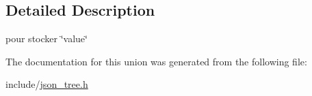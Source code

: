 \subsection{Detailed Description}
pour stocker \char`\"{}value\char`\"{} 

The documentation for this union was generated from the following file\+:\begin{DoxyCompactItemize}
\item 
include/\hyperlink{json__tree_8h}{json\+\_\+tree.\+h}\end{DoxyCompactItemize}
